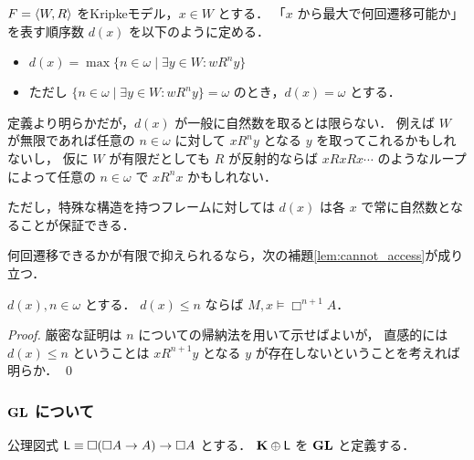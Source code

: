 \documentclass{jlreq}
\begin{document}
\begin{definition}
	$F = \langle W, R \rangle$ をKripkeモデル，$x \in W$ とする．
	「$x$ から最大で何回遷移可能か」を表す順序数 $d(x)$ を以下のように定める．
	\begin{itemize}
		\item $d(x) = \max \{ n \in \omega \mid \exists y \in W \colon w R^n y \}$
		\item ただし $\{ n \in \omega \mid \exists y \in W \colon w R^n y \} = \omega$ のとき，$d(x) = \omega$ とする．
	\end{itemize}
\end{definition}

\begin{remark}
	定義より明らかだが，$d(x)$ が一般に自然数を取るとは限らない．
	例えば $W$ が無限であれば任意の $n \in \omega$ に対して $x R^n y$ となる $y$ を取ってこれるかもしれないし，
	仮に $W$ が有限だとしても $R$ が反射的ならば $x R x R x \cdots$ のようなループによって任意の $n \in \omega$ で $x R^n x$ かもしれない．

	ただし，特殊な構造を持つフレームに対しては $d(x)$ は各 $x$ で常に自然数となることが保証できる．
\end{remark}

何回遷移できるかが有限で抑えられるなら，次の補題\ref{lem:cannot_access}が成り立つ．

\begin{lemma}\label{lem:cannot_access}
	$d(x), n \in \omega$ とする．
	$d(x) \leq n$ ならば $M,x \vDash \Box^{n + 1} A$．
\end{lemma}

\begin{proof}
	厳密な証明は $n$ についての帰納法を用いて示せばよいが，
	直感的には $d(x) \leq n$ ということは $x R^{n + 1} y$ となる $y$ が存在しないということを考えれば明らか．
	\qed
\end{proof}

\subsubsection{$\LogicGL$ について}

\begin{definition}
	公理図式 $\mathsf{L} \equiv \Box(\Box A \to A) \to \Box A$ とする．\index{$\AxL$}
	$\mathbf{K} \oplus \mathsf{L}$ を $\LogicGL$ と定義する．\index{$\LogicGL$}
\end{definition}
\end{document}

